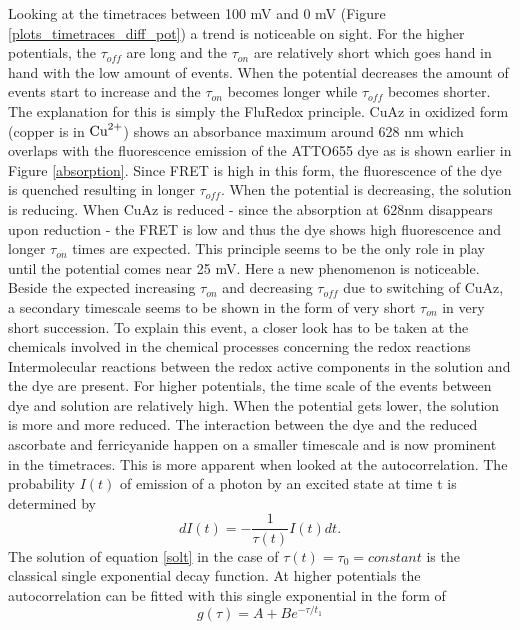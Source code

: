 \documentclass[twoside,single]{lion-msc}
\begin{document}
Looking at the timetraces between 100 mV and 0 mV (Figure \ref{plots_timetraces_diff_pot}) a trend is noticeable on sight. For the higher potentials, the $\tau_{off}$ are long and the $\tau_{on}$ are relatively short which goes hand in hand with the low amount of events. When the potential decreases the amount of events start to increase and the $\tau_{on}$ becomes longer while $\tau_{off}$ becomes shorter. The explanation for this is simply the FluRedox principle. CuAz in oxidized form (copper is in $\textup{Cu}^{2+}$) shows an absorbance maximum around 628 nm which overlaps with the fluorescence emission of the ATTO655 dye as is shown earlier in Figure \ref{absorption}. Since FRET is high in this form, the fluorescence of the dye is quenched resulting in longer $\tau_{off}$. When the potential is decreasing, the solution is reducing. When CuAz is reduced - since the absorption at 628nm disappears upon reduction - the FRET is low and thus the dye  shows high fluorescence and longer $\tau_{on}$ times are expected. This principle seems to be the only role in play until the potential comes near 25 mV. Here a new phenomenon is noticeable. Beside the expected  increasing $\tau_{on}$ and decreasing $\tau_{off}$ due to switching of CuAz, a secondary timescale seems to be shown in the form of very short $\tau_{on}$ in very short succession. To explain this event, a closer look has to be taken at the chemicals involved in the chemical processes concerning the redox reactions Intermolecular reactions between the redox active components in the solution and the dye are present. For higher potentials, the time scale of the events between dye and solution are relatively high. When the potential gets lower, the solution is more and more reduced. The interaction between the dye and the reduced ascorbate and ferricyanide happen on a smaller timescale and is now prominent in the timetraces. This is more apparent when looked at the autocorrelation. The probability $I(t)$ of emission of a photon by an excited state at time t is determined by
\begin{equation} \label{solt}
dI(t) = -\frac{1}{\tau(t)}I(t)dt.
\end{equation}
The solution of equation \ref{solt} in the case of $\tau(t) = \tau_{0}= constant$ is the classical single exponential decay function. At higher potentials the autocorrelation can be fitted with this single exponential in the form of
\begin{equation} \label{single_exp}
g(\tau) =  A + Be^{-\tau/t_{1}}
\end{equation}
\end{document}
